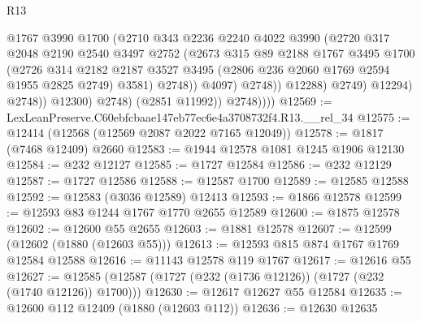\begin{lexlean}{R13}
\begin{coremodule}
                                @1767
                                @3990
                                @1700
                                (@2710
                                  @343
                                  @2236
                                  @2240
                                  @4022
                                  @3990
                                  (@2720
                                    @317
                                    @2048
                                    @2190
                                    @2540
                                    @3497
                                    @2752
                                    (@2673
                                      @315
                                      @89
                                      @2188
                                      @1767
                                      @3495
                                      @1700
                                      (@2726
                                        @314
                                        @2182
                                        @2187
                                        @3527
                                        @3495
                                        (@2806 @236 @2060 @1769 @2594 @1955 @2825 @2749)
                                        @3581)
                                      @2748))
                                  @4097)
                                @2748))
                            @12288)
                          @2749)
                        @12294)
                      @2748))
                  @12300)
                @2748)
              (@2851 @11992))
            @2748))))
@12569 := LexLeanPreserve.C60ebfcbaae147eb77ec6e4a3708732f4.R13.__rel_34
@12575 := @12414 (@12568 (@12569 @2087 @2022 @7165 @12049))
@12578 := @1817 (@7468 @12409) @2660
@12583 := @1944 @12578 @1081 @1245 @1906 @12130
@12584 := @232 @12127
@12585 := @1727 @12584
@12586 := @232 @12129
@12587 := @1727 @12586
@12588 := @12587 @1700
@12589 := @12585 @12588
@12592 := @12583 (@3036 @12589) @12413
@12593 := @1866 @12578
@12599 := @12593 @83 @1244 @1767 @1770 @2655 @12589
@12600 := @1875 @12578
@12602 := @12600 @55 @2655
@12603 := @1881 @12578
@12607 := @12599 (@12602 (@1880 (@12603 @55)))
@12613 := @12593 @815 @874 @1767 @1769 @12584 @12588
@12616 := @11143 @12578 @119 @1767
@12617 := @12616 @55
@12627 := @12585 (@12587 (@1727 (@232 (@1736 @12126)) (@1727 (@232 (@1740 @12126)) @1700)))
@12630 := @12617 @12627 @55 @12584
@12635 := @12600 @112 @12409 (@1880 (@12603 @112))
@12636 := @12630 @12635

\end{coremodule}
\end{lexlean}
